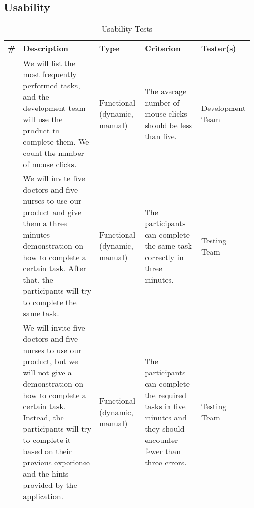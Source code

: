 \documentclass[12pt]{article}
\newcounter{TestCounter}
\begin{document}
\subsection{Usability}
\begin{center}
	\begin{longtable}{c>{\raggedright\arraybackslash}p{4.8cm} >{\raggedright\arraybackslash}p{3.5cm}>{\raggedright\arraybackslash}p{3cm}>{\raggedright\arraybackslash}p{3cm}}
		\caption{Usability Tests}\label{Usability Tests}\\
		\toprule
		\bf \# & \bf Description & \bf Type & \bf Criterion & Tester(s) \\\midrule
		\stepcounter{TestCounter}\arabic{TestCounter} 
		& We will list the most frequently performed tasks, and the development
		team will use the product to complete them. We count the number of
		mouse clicks.
		& Functional (dynamic, manual)	
		& The average number of mouse clicks should be less than five.    
		& 	Development Team
		\\\midrule
		\stepcounter{TestCounter}\arabic{TestCounter} 
		& We will invite five doctors and five nurses to use our product and
		give them a three minutes demonstration on how to complete a certain
		task. After that, the participants will try to complete the same task.
		& Functional (dynamic, manual)	
		& The participants can complete the same task correctly in three minutes.  
		& 	Testing Team
		\\\midrule
		\stepcounter{TestCounter}\arabic{TestCounter} 
		& We will invite five doctors and five nurses to use our product, but
		we will not give a demonstration on how to complete a certain task.
		Instead, the participants will try to complete it based
		on their previous experience and the hints provided by the application.
		& Functional (dynamic, manual)	
		& The participants can complete the required tasks in five minutes and
		they should encounter fewer than three errors.  
		& 	Testing Team
		\\\midrule
		\bottomrule
	\end{longtable}
\end{center}
\end{document}
